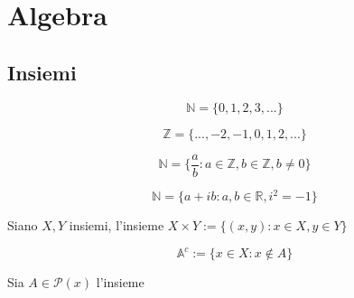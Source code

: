 \chapter{Algebra}
    \section{Insiemi}
        \begin{definition}
            $$\mathbb{N} = \{0,1,2,3,...\}$$
        \end{definition}
        \begin{definition}
            $$\mathbb{Z} = \{...,-2,-1,0,1,2,...\}$$
        \end{definition}
        \begin{definition}
            $$\mathbb{N} = \{\frac{a}{b}: a \in \mathbb{Z}, b \in \mathbb{Z}, b \neq 0 \}$$
        \end{definition}
        \begin{definition}
        \end{definition}
        \begin{definition}
            $$\mathbb{N} = \{a+ib: a,b \in \mathbb{R}, i^2=-1\}$$
        \end{definition}
        \begin{definition}
            Siano $X,Y$ insiemi, l'insieme $X \times Y:= \{(x,y): x \in X, y \in Y\}$
        \end{definition}
        \begin{definition}
            $$\mathbb{A}^c := \{x \in X : x \notin A \}$$
        \end{definition}
        \begin{definition}
            Sia $A \in \mathcal{P}(x)$ l'insieme
        \end{definition}

